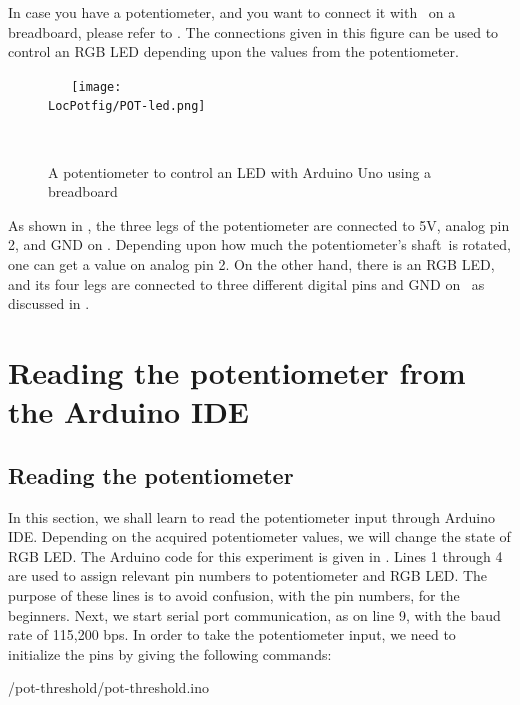 In case you have a potentiometer, and you want to connect it with \arduino\ on a breadboard, 
please refer to . The connections given in this figure 
can be used to control an RGB LED depending upon the values from the potentiometer.  
\begin{figure}
  \centering
  \texttt{[image: \\LocPotfig/POT-led.png]}
  \caption{A potentiometer to control an LED with Arduino Uno using a breadboard}
  \label{fig:pot-led}
\end{figure}
As shown in , the three legs of the potentiometer are connected to 
5V, analog pin 2, and GND on \arduino. Depending upon how much the potentiometer's shaft is rotated, one can get a value on analog pin 2. On the other hand, 
there is an RGB LED, and its four legs are connected to three different digital pins and GND on \arduino\, as discussed in 
. 



\section{Reading the potentiometer from the Arduino IDE}
\subsection{Reading the potentiometer}
In this section, we shall learn to read the potentiometer input
through Arduino IDE. Depending on the acquired potentiometer values,
we will change the state of RGB LED. The Arduino code for this
experiment is given in . Lines 1 through 4 are
used to assign relevant pin numbers to potentiometer and RGB LED. The
purpose of these lines is to avoid confusion, with the pin numbers,
for the beginners. Next, we start serial port communication, as on
line 9, with the baud rate of 115,200 bps. In order to take the
potentiometer input, we need to initialize the pins by giving the
following commands:


{\LocPotardcode/pot-threshold/pot-threshold.ino}

